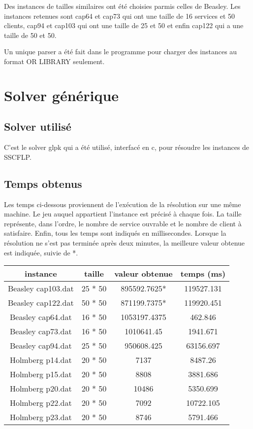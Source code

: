 Des instances de tailles similaires ont été choisies parmis celles de Beasley.
Les instances retenues sont cap64 et cap73 qui ont une taille de 16 services et 50 clients, cap94 et cap103 qui ont une taille de 25 et 50 et enfin cap122 qui a une taille de 50 et 50.\newline

Un unique parser a été fait dans le programme pour charger des instances au format OR LIBRARY seulement.

\section{Solver générique}

\subsection{Solver utilisé}

C'est le solver glpk qui a été utilisé, interfacé en c, pour résoudre les instances de SSCFLP.

\subsection{Temps obtenus}

Les temps ci-dessous proviennent de l'exécution de la résolution sur une même machine.
Le jeu auquel appartient l'instance est précisé à chaque fois.
La taille représente, dans l'ordre, le nombre de service ouvrable et le nombre de client à satisfaire.
Enfin, tous les temps sont indiqués en millisecondes.
Lorsque la résolution ne s'est pas terminée après deux minutes, la meilleure valeur obtenue est indiquée, suivie de *. \newline

\begin{tabular}{|c|c|c|c|}
    \hline
    instance  & taille &  valeur obtenue & temps (ms) \\
    \hline
    Beasley cap103.dat & 25 * 50 & 895592.7625* & 119527.131 \\
    Beasley cap122.dat & 50 * 50 & 871199.7375* & 119920.451 \\
    Beasley cap64.dat & 16 * 50 & 1053197.4375 & 462.846 \\
    Beasley cap73.dat & 16 * 50 & 1010641.45 & 1941.671 \\
    Beasley cap94.dat & 25 * 50 & 950608.425 & 63156.697 \\
    Holmberg p14.dat & 20 * 50 & 7137 & 8487.26 \\
    Holmberg p15.dat & 20 * 50 & 8808 & 3881.686 \\
    Holmberg p20.dat & 20 * 50 & 10486 & 5350.699 \\
    Holmberg p22.dat & 20 * 50 & 7092 & 10722.105 \\
    Holmberg p23.dat & 20 * 50 & 8746 & 5791.466 \\
    \hline
\end{tabular}
